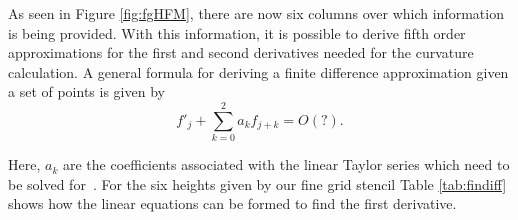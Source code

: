 \noindent As seen in Figure \ref{fig:fgHFM}, there are now six columns over which information is being provided. With this information, it is possible to derive fifth order approximations for the first and second derivatives needed for the curvature calculation. A general formula for deriving a finite difference approximation given a set of points is given by
\begin{equation}
f'_j + \sum_{k=0}^{2} a_k f_{j+k} = O(?).
\end{equation}

\noindent Here, $a_k$ are the coefficients associated with the linear Taylor series which need to be solved for~\cite{moin}. For the six heights given by our fine grid stencil Table \ref{tab:findiff} shows how the linear equations can be formed to find the first derivative.


